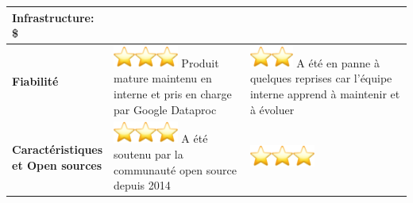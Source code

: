 \begin{longtable}{|p{0.23\linewidth}|p{0.35\linewidth}|p{0.42\linewidth}|}
Infrastructure: \textcolor[RGB]{0, 128, 0}{\textbf{\large \$}} \\ \hline
\textbf{Fiabilité} & 
\includegraphics[width=0.28in,height=0.28in]{images/image3.png}\includegraphics[width=0.28in,height=0.28in]{images/image3.png}\includegraphics[width=0.28in,height=0.28in]{images/image3.png}\newline
Produit mature maintenu en interne et pris en charge par Google Dataproc &
\includegraphics[width=0.28in,height=0.28in]{images/image3.png}\includegraphics[width=0.28in,height=0.28in]{images/image3.png}\newline
A été en panne à quelques reprises car l'équipe interne apprend à maintenir et à évoluer \\ \hline
\textbf{Caractéristiques et Open sources} & 
\includegraphics[width=0.28in,height=0.28in]{images/image3.png}\includegraphics[width=0.28in,height=0.28in]{images/image3.png}\includegraphics[width=0.28in,height=0.28in]{images/image3.png}\newline
A été soutenu par la communauté open source depuis 2014 &
\includegraphics[width=0.28in,height=0.28in]{images/image3.png}\includegraphics[width=0.28in,height=0.28in]{images/image3.png}\includegraphics[width=0.28in,height=0.28in]{images/image3.png}\newline

\end{longtable}
